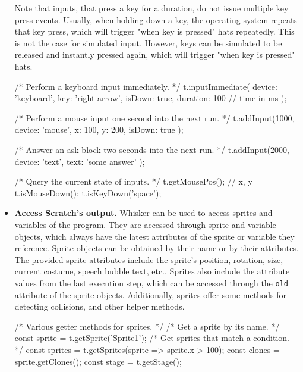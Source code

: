 \begin{itemize}
        Note that inputs, that press a key for a duration, do not issue multiple key press events.
        Usually, when holding down a key, the operating system repeats that key press,
        which will trigger "when key is pressed" hats repeatedly.
        This is not the case for simulated input.
        However, keys can be simulated to be released and instantly pressed again,
        which will trigger "when key is pressed" hats.
        \begin{javascriptcode}
            /* Perform a keyboard input immediately. */
            t.inputImmediate({
                device: 'keyboard',
                key: 'right arrow',
                isDown: true,
                duration: 100 // time in ms
            });

            /* Perform a mouse input one second into the next run. */
            t.addInput(1000, { device: 'mouse', x: 100, y: 200, isDown: true });

            /* Answer an ask block two seconds into the next run. */
            t.addInput(2000, { device: 'text', text: 'some answer' });

            /* Query the current state of inputs. */
            t.getMousePos(); // {x, y}
            t.isMouseDown();
            t.isKeyDown('space');
        \end{javascriptcode}
    \item \textbf{Access Scratch's output.}
        Whisker can be used to access sprites and variables of the program.
        They are accessed through sprite and variable objects, which always have the latest attributes of the sprite or variable they reference.
        Sprite objects can be obtained by their name or by their attributes.
        The provided sprite attributes include the sprite's position, rotation, size, current costume, speech bubble text, etc..
        Sprites also include the attribute values from the last execution step,
        which can be accessed through the \texttt{old} attribute of the sprite objects.
        Additionally, sprites offer some methods for detecting collisions, and other helper methods.
        \begin{javascriptcode}
            /* Various getter methods for sprites. */
                /* Get a sprite by its name. */
            const sprite = t.getSprite('Sprite1');
                /* Get sprites that match a condition. */
            const sprites = t.getSprites(sprite => sprite.x > 100);
            const clones = sprite.getClones();
            const stage = t.getStage();


\end{javascriptcode}
\end{itemize}
